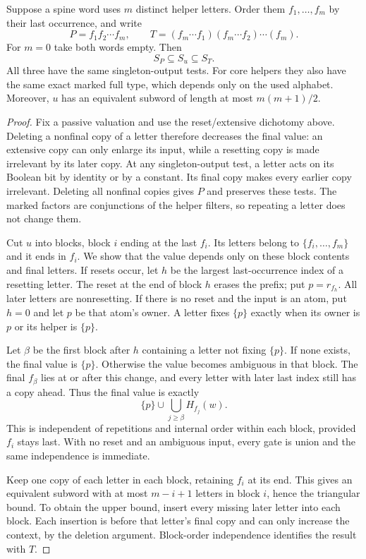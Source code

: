 \begin{theorem}
\label{core:thm:spine-block-normal-form}
Suppose a spine word uses $m$ distinct helper letters. Order them
$f_1,\ldots,f_m$ by their last occurrence, and write
\[
 P=f_1f_2\cdots f_m,\qquad
 T=(f_m\cdots f_1)(f_m\cdots f_2)\cdots(f_m).
\]
For $m=0$ take both words empty.
Then
\[
 S_P\subseteq S_u\subseteq S_T.
\]
All three have the same singleton-output tests. For core helpers they
also have the same exact marked full type, which depends only on the
used alphabet. Moreover, $u$ has an equivalent subword of length at most
$m(m+1)/2$.
\end{theorem}
\begin{proof}
Fix a passive valuation and use the reset/extensive dichotomy above.
Deleting a nonfinal copy of
a letter therefore decreases the final value: an extensive copy can only
enlarge its input, while a resetting copy is made irrelevant by its later
copy. At any singleton-output test, a letter acts on its Boolean bit by
identity or by a constant. Its final copy makes every earlier copy
irrelevant. Deleting all nonfinal copies gives $P$ and preserves these
tests. The marked factors are conjunctions of the helper filters, so
repeating a letter does not change them.

Cut $u$ into blocks, block $i$ ending at the last $f_i$.
Its letters belong to $\{f_i,\ldots,f_m\}$ and it ends in $f_i$.
We show that the value depends only on these block contents and final
letters. If resets occur, let $h$ be the largest last-occurrence index of
a resetting letter. The reset at the end of block $h$ erases the prefix;
put $p=r_{f_h}$. All later letters are nonresetting. If there is no reset
and the input is an atom, put $h=0$ and let $p$ be that atom's owner.
A letter fixes $\{p\}$ exactly when its owner is $p$ or its helper is
$\{p\}$.

Let $\beta$ be the first block after $h$ containing a letter not fixing
$\{p\}$. If none exists, the final value is $\{p\}$. Otherwise the
value becomes ambiguous in that block. The final $f_\beta$ lies at or after
this change, and every letter with later last index still has a copy ahead.
Thus the final value is exactly
\[
 \{p\}\cup\bigcup_{j\geq\beta}H_{f_j}(w).
\]
This is independent of repetitions and internal order within each block,
provided $f_i$ stays last. With no reset and an ambiguous input, every
gate is union and the same independence is immediate.

Keep one copy of each letter in each block, retaining $f_i$ at its end.
This gives an equivalent subword with at most $m-i+1$ letters in block $i$,
hence the triangular bound. To obtain the upper bound, insert every missing
later letter into each block. Each insertion is before that letter's final
copy and can only increase the context, by the deletion argument.
Block-order independence identifies the result with $T$.
\end{proof}

